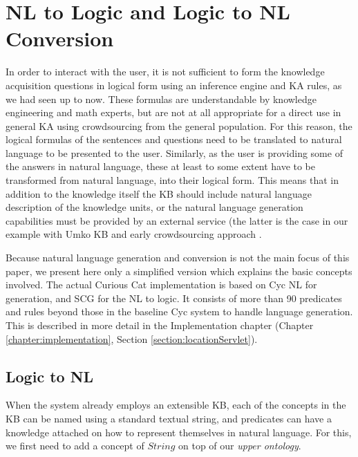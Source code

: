\section{NL to Logic and Logic to NL Conversion}
\label{section:nl}
In order to interact with the user, it is not sufficient to form the knowledge 
acquisition questions in logical form using an inference engine and KA rules,
as we had seen up to now. These formulas are understandable by knowledge 
engineering and math experts, but are not at all appropriate for a direct use 
in general KA using crowdsourcing from the general population. For this reason,
the logical formulas of the sentences and questions need to be translated to 
natural language to be presented to the user. Similarly, as the user is 
providing some of the answers in natural language, these at least to some extent
have to be transformed from natural language, into their logical form.
This means that in addition to the knowledge itself the KB should include 
natural language description of the knowledge units, or the natural language 
generation capabilities must be provided by an external service (the latter is 
the case in our example with Umko KB \parencite{Bradesko2015} and
early crowdsourcing approach \parencite{Bradesko2012a}. 

Because natural language generation and conversion is not the main focus of 
this paper, we present here only a simplified version which explains the basic 
concepts involved. The actual Curious Cat implementation is based on 
Cyc NL \parencite{Baxter2005} for generation, and SCG \parencite{Schneider2015}
for the NL to logic. It consists of more than 90 predicates and rules beyond 
those in the baseline Cyc system to handle language generation. This is 
described in more detail in the Implementation chapter 
(Chapter \ref{chapter:implementation}, Section \ref{section:locationServlet}).

\subsection{Logic to NL}
\label{section:logicNL}
When the system already employs an extensible KB, each of the concepts in the 
KB can be named using a standard textual string, and predicates can have 
a knowledge attached on how to represent themselves in natural language. For 
this, we first need to add a concept of $String$ on top of our 
\emph{upper ontology}.

